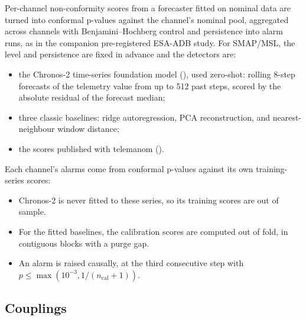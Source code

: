 \documentclass[
]{article}
\providecommand{\tightlist}{%
  \setlength{\itemsep}{0pt}\setlength{\parskip}{0pt}}
\begin{document}
Per-channel non-conformity scores from a forecaster fitted on nominal
data are turned into conformal p-values against the channel's nominal
pool, aggregated across channels with Benjamini--Hochberg control and
persistence into alarm runs, as in the companion pre-registered ESA-ADB
study. For SMAP/MSL, the level and persistence are fixed in advance and
the detectors are:

\begin{itemize}
\tightlist
\item
  the Chronos-2 time-series foundation model
  (), used
  zero-shot: rolling 8-step forecasts of the telemetry value from up to
  512 past steps, scored by the absolute residual of the forecast
  median;
\item
  three classic baselines: ridge autoregression, PCA reconstruction, and
  nearest-neighbour window distance;
\item
  the scores published with telemanom
  ().
\end{itemize}

Each channel's alarms come from conformal p-values against its own
training-series scores:

\begin{itemize}
\tightlist
\item
  Chronos-2 is never fitted to these series, so its training scores are
  out of sample.
\item
  For the fitted baselines, the calibration scores are computed out of
  fold, in contiguous blocks with a purge gap.
\item
  An alarm is raised causally, at the third consecutive step with
  \(p \le \max(10^{-3}, 1/(n_\text{cal}+1))\).
\end{itemize}

\subsection{Couplings}\label{couplings}
\end{document}
